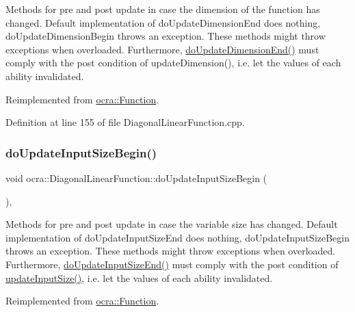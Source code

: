 Methods for pre and post update in case the dimension of the function has changed. Default implementation of do\+Update\+Dimension\+End does nothing, do\+Update\+Dimension\+Begin throws an exception. These methods might throw exceptions when overloaded. Furthermore, {\ttfamily \hyperlink{classocra_1_1Function_a17aa280f0e6eff4a7569edc373a5147d}{do\+Update\+Dimension\+End()}} must comply with the post condition of {\ttfamily update\+Dimension()}, i.\+e. let the values of each ability invalidated. 

Reimplemented from \hyperlink{classocra_1_1Function_afdf98e9f43fde97a5256af88a50cbb39}{ocra\+::\+Function}.



Definition at line 155 of file Diagonal\+Linear\+Function.\+cpp.

\hypertarget{classocra_1_1DiagonalLinearFunction_a2071e4c52785c88119917460b94773cb}{}\label{classocra_1_1DiagonalLinearFunction_a2071e4c52785c88119917460b94773cb} 
\subsubsection{\texorpdfstring{do\+Update\+Input\+Size\+Begin()}{doUpdateInputSizeBegin()}}
{\footnotesize\ttfamily void ocra\+::\+Diagonal\+Linear\+Function\+::do\+Update\+Input\+Size\+Begin (\begin{DoxyParamCaption}{ }\end{DoxyParamCaption})\hspace{0.3cm}{\ttfamily [protected]}, {\ttfamily [virtual]}}

Methods for pre and post update in case the variable size has changed. Default implementation of do\+Update\+Input\+Size\+End does nothing, do\+Update\+Input\+Size\+Begin throws an exception. These methods might throw exceptions when overloaded. Furthermore, {\ttfamily \hyperlink{classocra_1_1DiagonalLinearFunction_a8a51d23c302c9bad9579b95e29481f55}{do\+Update\+Input\+Size\+End()}} must comply with the post condition of {\ttfamily \hyperlink{classocra_1_1Function_a3a5b9e6ae296339acc87ab2cbf97ef98}{update\+Input\+Size()}}, i.\+e. let the values of each ability invalidated. 

Reimplemented from \hyperlink{classocra_1_1Function_a3f728f3758e6448aa59932853db5ddcc}{ocra\+::\+Function}.



